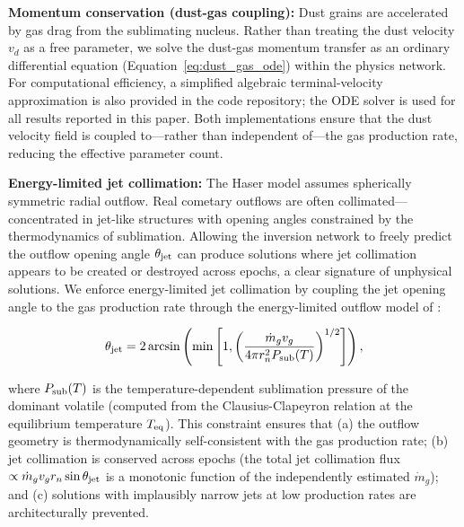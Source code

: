 \documentclass[usenatbib]{mnras}
\begin{document}
\textbf{Momentum conservation (dust-gas coupling):} Dust grains are accelerated by gas drag from the sublimating nucleus. Rather than treating the dust velocity $v_d$ as a free parameter, we solve the dust-gas momentum transfer as an ordinary differential equation (Equation~\ref{eq:dust_gas_ode}) within the physics network. For computational efficiency, a simplified algebraic terminal-velocity approximation is also provided in the code repository; the ODE solver is used for all results reported in this paper. Both implementations ensure that the dust velocity field is coupled to---rather than independent of---the gas production rate, reducing the effective parameter count.

\textbf{Energy-limited jet collimation:} The Haser model assumes spherically symmetric radial outflow. Real cometary outflows are often collimated---concentrated in jet-like structures with opening angles constrained by the thermodynamics of sublimation. Allowing the inversion network to freely predict the outflow opening angle $\theta_{\rm jet}$ can produce solutions where jet collimation appears to be created or destroyed across epochs, a clear signature of unphysical solutions. We enforce energy-limited jet collimation by coupling the jet opening angle to the gas production rate through the energy-limited outflow model of \citet{belton07}:

\begin{equation}\label{eq:hard_angular}
\theta_{\rm jet} = 2 \arcsin\left(\min\left[1, \left(\frac{\dot{m}_g v_g}{4 \pi r_n^2 P_{\rm sub}(T)}\right)^{1/2}\right]\right),
\end{equation}

where $P_{\rm sub}(T)$ is the temperature-dependent sublimation pressure of the dominant volatile (computed from the Clausius-Clapeyron relation at the equilibrium temperature $T_{\rm eq}$). This constraint ensures that (a) the outflow geometry is thermodynamically self-consistent with the gas production rate; (b) jet collimation is conserved across epochs (the total jet collimation flux $\propto \dot{m}_g v_g r_n \sin\theta_{\rm jet}$ is a monotonic function of the independently estimated $\dot{m}_g$); and (c) solutions with implausibly narrow jets at low production rates are architecturally prevented.
\end{document}
